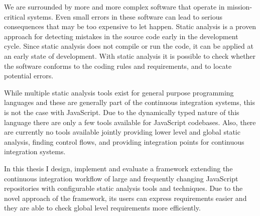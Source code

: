 We are surrounded by more and more complex software that operate in mission-critical systems. Even small errors in these software can lead to serious consequences that may be too expensive to let happen. Static analysis is a proven approach for detecting mistakes in the source code early in the development cycle. Since static analysis does not compile or run the code, it can be applied at an early state of development. With static analysis it is possible to check whether the software conforms to the coding rules and requirements, and to locate potential errors.

While multiple static analysis tools exist for general purpose programming languages and these are generally part of the continuous integration systems, this is not the case with JavaScript. Due to the dynamically typed nature of this language there are only a few tools available for JavaScript codebases. Also, there are currently no tools available jointly providing lower level and global static analysis, finding control flows, and providing integration points for continuous integration systems.

In this thesis I design, implement and evaluate a framework extending the continuous integration workflow of large and frequently changing JavaScript repositories with configurable static analysis tools and techniques. Due to the novel approach of the framework, its users can express requirements easier and they are able to check global level requirements more efficiently.

\clearpage
